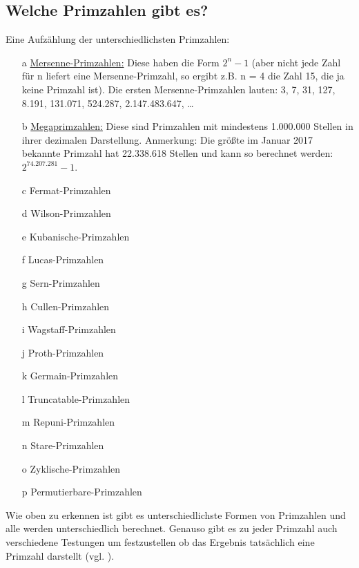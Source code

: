 \documentclass[german,12pt,a4paper]{article}
\begin{document}
\subsection{Welche Primzahlen gibt es?}\label{Welche Primzahlen gibt es?}
Eine Aufzählung der unterschiedlichsten Primzahlen:
\begin{itemize}
\item [a]\underline{Mersenne-Primzahlen:} Diese haben die Form $2^{n}-1$ (aber nicht jede Zahl für n liefert  eine Mersenne-Primzahl, so ergibt z.B. n = 4 die Zahl 15, die ja keine Primzahl ist).
Die ersten Mersenne-Primzahlen lauten: 3, 7, 31, 127, 8.191, 131.071, 524.287, 2.147.483.647, …
\item [b]\underline{Megaprimzahlen:} Diese sind Primzahlen mit mindestens 1.000.000 Stellen in ihrer dezimalen Darstellung.
Anmerkung: Die größte im Januar 2017 bekannte Primzahl hat 22.338.618 Stellen und kann so berechnet werden: $2^{74.207.281}-1$.
\item [c]Fermat-Primzahlen
\item [d]Wilson-Primzahlen
\item [e]Kubanische-Primzahlen
\item [f]Lucas-Primzahlen
\item [g]Sern-Primzahlen
\item [h]Cullen-Primzahlen
\item [i]Wagstaff-Primzahlen
\item [j]Proth-Primzahlen
\item [k]Germain-Primzahlen
\item [l]Truncatable-Primzahlen
\item [m]Repuni-Primzahlen
\item [n]Stare-Primzahlen
\item [o]Zyklische-Primzahlen
\item [p]Permutierbare-Primzahlen
\end{itemize}
Wie oben zu erkennen ist gibt es unterschiedlichste Formen von Primzahlen und alle werden unterschiedlich berechnet.
Genauso gibt es zu jeder Primzahl auch verschiedene Testungen um festzustellen ob das Ergebnis tatsächlich eine Primzahl darstellt (vgl. \cite[86--90]{Engel2017}).
\end{document}
